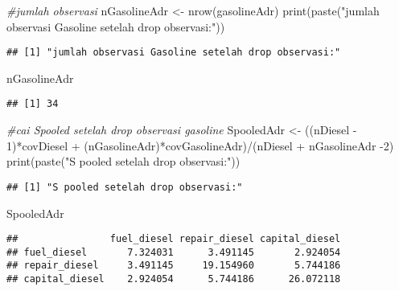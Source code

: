 \documentclass[
]{article}
\newenvironment{Shaded}{\begin{snugshade}}{\end{snugshade}}
\newcommand{\CommentTok}[1]{\textcolor[rgb]{0.56,0.35,0.01}{\textit{#1}}}
\newcommand{\DecValTok}[1]{\textcolor[rgb]{0.00,0.00,0.81}{#1}}
\newcommand{\FunctionTok}[1]{\textcolor[rgb]{0.00,0.00,0.00}{#1}}
\newcommand{\NormalTok}[1]{#1}
\newcommand{\OtherTok}[1]{\textcolor[rgb]{0.56,0.35,0.01}{#1}}
\newcommand{\SpecialCharTok}[1]{\textcolor[rgb]{0.00,0.00,0.00}{#1}}
\newcommand{\StringTok}[1]{\textcolor[rgb]{0.31,0.60,0.02}{#1}}
\begin{document}
\begin{Shaded}
\begin{Highlighting}[]
\CommentTok{\#jumlah observasi}
\NormalTok{nGasolineAdr }\OtherTok{\textless{}{-}} \FunctionTok{nrow}\NormalTok{(gasolineAdr)}
\FunctionTok{print}\NormalTok{(}\FunctionTok{paste}\NormalTok{(}\StringTok{"jumlah observasi Gasoline setelah drop observasi:"}\NormalTok{))}
\end{Highlighting}
\end{Shaded}

\begin{verbatim}
## [1] "jumlah observasi Gasoline setelah drop observasi:"
\end{verbatim}

\begin{Shaded}
\begin{Highlighting}[]
\NormalTok{nGasolineAdr}
\end{Highlighting}
\end{Shaded}

\begin{verbatim}
## [1] 34
\end{verbatim}

\begin{Shaded}
\begin{Highlighting}[]
\CommentTok{\#cai Spooled setelah drop observasi gasoline}
\NormalTok{SpooledAdr }\OtherTok{\textless{}{-}}\NormalTok{ ((nDiesel }\SpecialCharTok{{-}} \DecValTok{1}\NormalTok{)}\SpecialCharTok{*}\NormalTok{covDiesel }\SpecialCharTok{+}\NormalTok{ (nGasolineAdr)}\SpecialCharTok{*}\NormalTok{covGasolineAdr)}\SpecialCharTok{/}\NormalTok{(nDiesel }\SpecialCharTok{+}\NormalTok{ nGasolineAdr }\SpecialCharTok{{-}}\DecValTok{2}\NormalTok{)}
\FunctionTok{print}\NormalTok{(}\FunctionTok{paste}\NormalTok{(}\StringTok{"S pooled setelah drop observasi:"}\NormalTok{))}
\end{Highlighting}
\end{Shaded}

\begin{verbatim}
## [1] "S pooled setelah drop observasi:"
\end{verbatim}

\begin{Shaded}
\begin{Highlighting}[]
\NormalTok{SpooledAdr}
\end{Highlighting}
\end{Shaded}

\begin{verbatim}
##                fuel_diesel repair_diesel capital_diesel
## fuel_diesel       7.324031      3.491145       2.924054
## repair_diesel     3.491145     19.154960       5.744186
## capital_diesel    2.924054      5.744186      26.072118
\end{verbatim}
\end{document}
